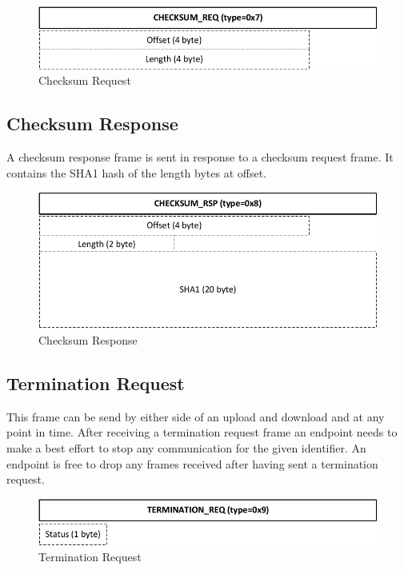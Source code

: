 \documentclass[]{article}
\begin{document}
\begin{figure}[H]
\centering
\includegraphics[width=\textwidth]{frames/checksum-req.pdf}
\caption{Checksum Request}
\label{CHECKSUM-REQ}
\end{figure}

\subsection{Checksum Response}
A checksum response frame is sent in response to a checksum request frame. It contains the SHA1
hash of the length bytes at offset. 

\begin{figure}[H]
\centering
\includegraphics[width=\textwidth]{frames/checksum-rsp.pdf}
\caption{Checksum Response}
\label{CHECKSUM-RSP}
\end{figure}

\subsection{Termination Request}
\label{TERMINATION-REQ}

This frame can be send by either side of an upload and
download and at any point in time. After receiving
a termination request frame an endpoint needs to make a best
effort to stop any communication for the given identifier.
An endpoint is free to drop any frames received after having 
sent a termination request.

\begin{figure}[H]
\centering
\includegraphics[width=\textwidth]{frames/shutdown-req.pdf}
\caption{Termination Request}

\end{figure}
\end{document}
